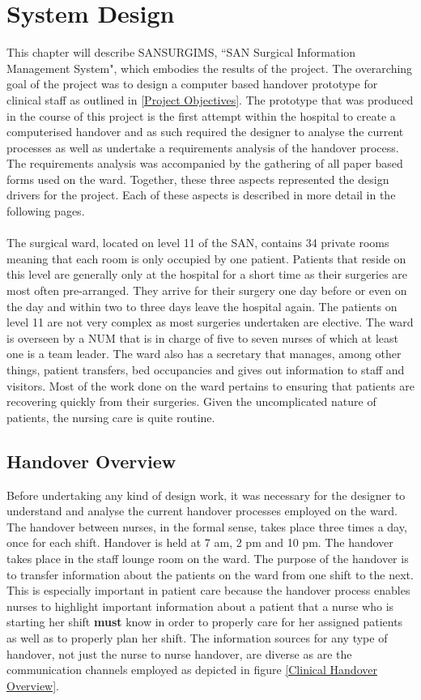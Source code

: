 \section{System Design}
This chapter will describe SANSURGIMS, ``SAN Surgical Information Management System", which embodies the results of the project. The overarching goal of the project was to design a computer based handover prototype for clinical staff as outlined in \ref{Project Objectives}. The prototype that was produced in the course of this project is the first attempt within the hospital to create a computerised handover and as such required the designer to analyse the current processes as well as undertake a requirements analysis of the handover process. The requirements analysis was accompanied by the gathering of all paper based forms used on the ward. Together, these three aspects represented the design drivers for the project. Each of these aspects is described in more detail in the following pages.   
\\ \\
The surgical ward, located on level 11 of the SAN, contains 34 private rooms meaning that each room is only occupied by one patient. Patients that reside on this level are generally only at the hospital for a short time as their surgeries are most often pre-arranged. They arrive for their surgery one day before or even on the day and within two to three days leave the hospital again. The patients on level 11 are not very complex as most surgeries undertaken are elective.  The ward is overseen by a \gls{NUM} that is in charge of five to seven nurses of which at least one is a team leader. The ward also has a secretary that manages, among other things, patient transfers, bed occupancies and gives out information to staff and visitors. Most of the work done on the ward pertains to ensuring that patients are recovering quickly from their surgeries. Given the uncomplicated nature of patients, the nursing care is quite routine.

\subsection{Handover Overview}
Before undertaking any kind of design work, it was necessary for the designer to understand and analyse the current handover processes employed on the ward.   The handover between nurses, in the formal sense, takes place three times a day, once for each shift. Handover is held at 7 am, 2 pm and 10 pm. The handover takes place in the staff lounge room on the ward. The purpose of the handover is to transfer information about the patients on the ward from one shift to the next. This is especially important in patient care because the handover process enables nurses to highlight important information about a patient that a nurse who is starting her shift \textbf{must} know in order to properly care for her assigned patients as well as to properly plan her shift. The information sources for any type of handover, not just the nurse to nurse handover, are diverse as are the communication channels employed as depicted in figure
\ref{Clinical Handover Overview}.

